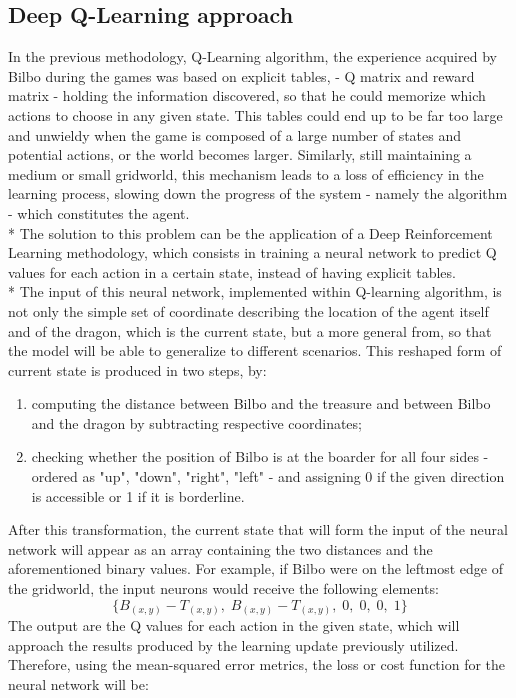 \subsection{Deep Q-Learning approach}
In the previous methodology, Q-Learning algorithm, the experience acquired by Bilbo during the games was based on explicit tables, - Q matrix and reward matrix - holding the information discovered, so that he could memorize which actions to choose in any given state. This tables could end up to be far too large and unwieldy when the game is composed of a large number of states and potential actions, or the world becomes larger. Similarly, still maintaining a medium or small gridworld, this mechanism leads to a loss of efficiency in the learning process, slowing down the progress of the system - namely the algorithm - which constitutes the agent.\\*
The solution to this problem can be the application of a Deep Reinforcement Learning methodology, which consists in training a neural network to predict Q values for each action in a certain state, instead of having explicit tables.\\*
The input of this neural network, implemented within Q-learning algorithm, is not only the simple set of coordinate describing the location of the agent itself and of the dragon, which is the current state, but a more general from, so that the model will be able to generalize to different scenarios. This reshaped form of current state is produced in two steps, by:
\begin{enumerate}
  \item computing the distance between Bilbo and the treasure and between Bilbo and the dragon by subtracting respective coordinates;
  \item checking whether the position of Bilbo is at the boarder  for all four sides - ordered as "up", "down", "right", "left" - and assigning 0 if the given direction is accessible or 1 if it is borderline.
\end{enumerate}
After this transformation, the current state that will form the input of the neural network will appear as an array containing the two distances and the aforementioned binary values. For example, if Bilbo were on the leftmost edge of the gridworld, the input neurons would receive the following elements:
$$
\{B_{(x,y)}-T_{(x,y)},\;B_{(x,y)}-T_{(x,y)},\;0,\;0,\;0,\;1\}
$$
The output are the Q values for each action in the given state, which will approach the results produced by the learning update previously utilized. Therefore, using the mean-squared error metrics, the loss or cost function for the neural network will be:
